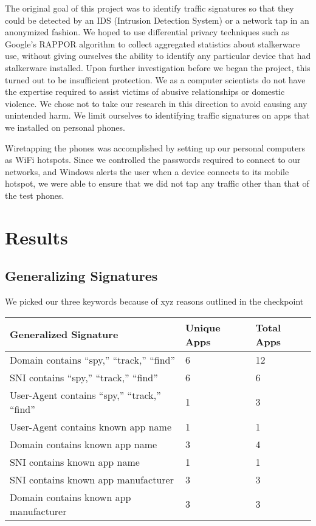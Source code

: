 \documentclass[acmtog]{acmart}
\begin{document}
The original goal of this project was to identify traffic signatures so that 
they could be detected by an IDS (Intrusion Detection System) or a network 
tap in an anonymized fashion. We hoped to use differential privacy techniques 
such as Google's RAPPOR algorithm \cite{erlingsson_rappor:_2014} to collect 
aggregated statistics about stalkerware use, without giving ourselves the 
ability to identify any particular device that had stalkerware installed. Upon 
further investigation before we began the project, this turned out to be 
insufficient protection. We as a computer 
scientists do not have the expertise required to assist victims of abusive 
relationships or domestic violence. We chose not to take our research in this 
direction to avoid causing any unintended harm. We limit ourselves to 
identifying traffic signatures on apps that we installed on personal phones.

Wiretapping the phones was accomplished by setting up our personal computers as 
WiFi hotspots. Since we controlled the passwords required to connect to our 
networks, and Windows alerts the user when a device connects to its mobile 
hotspot, we were able to ensure that we did not tap any traffic other than that 
of the test phones. 
\section{Results}

\subsection{Generalizing Signatures}

We picked our three keywords because of xyz reasons outlined in the checkpoint

\begin{table*}
	\begin{tabular}{p{5cm}p{5cm}p{5cm}}
		\toprule
		Generalized Signature & Unique Apps & Total Apps \\
		\hline
		Domain contains “spy,” “track,” “find” & 6 & 12 \\
		SNI contains “spy,” “track,” “find” & 6 & 6 \\
		User-Agent contains “spy,” “track,” “find” & 1 & 3 \\
		User-Agent contains known app name & 1 & 1 \\
		Domain contains known app name & 3 & 4 \\
		SNI contains known app name & 1 & 1 \\
		SNI contains known app manufacturer & 3 & 3 \\
		Domain contains known app manufacturer & 3 & 3 \\
		\midrule
	\end{tabular}
\end{table*}
\end{document}

